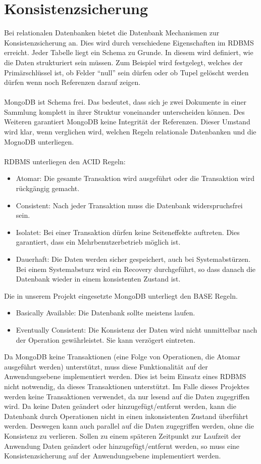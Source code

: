  \section{Konsistenzsicherung}
 Bei relationalen Datenbanken bietet die Datenbank Mechanismen zur Konsistenzsicherung 
 an. Dies wird durch verschiedene Eigenschaften im RDBMS
 erreicht. Jeder Tabelle liegt ein Schema zu Grunde. In diesem wird definiert,
 wie die Daten strukturiert sein müssen. Zum Beispiel wird festgelegt, welches
 der Primärschlüssel ist, ob Felder ``null'' sein dürfen oder ob Tupel gelöscht
 werden dürfen wenn noch Referenzen darauf zeigen.
 \\\\
 MongoDB ist Schema frei. Das bedeutet, dass sich je zwei Dokumente in einer
 Sammlung  komplett in ihrer Struktur voneinander unterscheiden können.
 Des Weiteren garantiert MongoDB keine Integrität der Referenzen. Dieser Umstand
 wird klar, wenn verglichen wird, welchen Regeln relationale Datenbanken und
 die MognoDB unterliegen.
 \\\\
 \noindent
 RDBMS unterliegen den ACID Regeln:
 \begin{itemize}
   \item Atomar: Die gesamte Transaktion wird ausgeführt oder die Transaktion
   wird rückgängig gemacht.
   \item Consistent: Nach jeder Transaktion muss die Datenbank widerspruchsfrei
   sein.
   \item Isolatet: Bei einer Transaktion dürfen keine Seiteneffekte
   auftreten. Dies garantiert, dass ein Mehrbenutzerbetrieb möglich ist.
   \item Dauerhaft: Die Daten werden sicher gespeichert, auch bei
   Systemabstürzen. Bei einem Systemabsturz wird ein Recovery durchgeführt, so 
   dass danach die Datenbank wieder in einem konsistenten Zustand ist.
 \end{itemize}
 Die in unserem Projekt eingesetzte MongoDB unterliegt den BASE Regeln.
 \begin{itemize}
   \item Basically Available: Die Datenbank sollte meistens laufen.
   \item Eventually Consistent: Die Konsistenz der Daten wird nicht unmittelbar
   nach der Operation gewährleistet. Sie kann verzögert eintreten.
\end{itemize}
\noindent
Da MongoDB keine Transaktionen (eine Folge von Operationen, die Atomar
ausgeführt werden) unterstützt, muss diese Funktionalität auf der
Anwendungsebene implementiert werden. Dies ist beim Einsatz eines RDBMS nicht
notwendig, da dieses Transaktionen unterstützt. Im Falle dieses Projektes werden keine
Transaktionen verwendet, da nur lesend auf die Daten zugegriffen wird.
Da keine Daten geändert oder hinzugefügt/entfernt werden,
kann die Datenbank durch Operationen nicht in einen inkonsistenten Zustand
überführt werden. Deswegen kann auch parallel auf die Daten zugegriffen
werden, ohne die Konsistenz zu verlieren. Sollen zu einem späteren Zeitpunkt zur
Laufzeit der Anwendung Daten geändert oder hinzugefügt/entfernt werden,
 so muss eine Konsistenzsicherung auf der Anwendungsebene  implementiert werden.